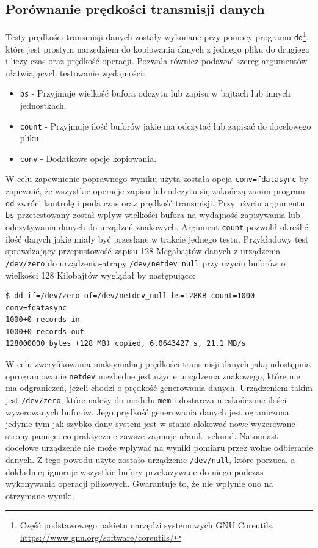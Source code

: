\documentclass[11pt]{scrartcl}
\begin{document}
\subsection{Porównanie prędkości transmisji danych}

Testy prędkości transmisji danych zostały wykonane przy pomocy programu \texttt{dd}\footnote{Część podstawowego pakietu narzędzi systemowych GNU Coreutils. \url{https://www.gnu.org/software/coreutils/}}, które jest prostym narzędziem do kopiowania danych z jednego pliku do drugiego i liczy czas oraz prędkość operacji. Pozwala również podawać szereg argumentów ułatwiających testowanie wydajności:

\begin{itemize}
    \item \texttt{bs} - Przyjmuje wielkość bufora odczytu lub zapisu w bajtach lub innych jednostkach.
    \item \texttt{count} - Przyjmuje ilość buforów jakie ma odczytać lub zapisać do docelowego pliku.
    \item \texttt{conv} - Dodatkowe opcje kopiowania.
\end{itemize}

W celu zapewnienie poprawnego wyniku użyta została opcja \texttt{conv=fdatasync} by zapewnić, że wszystkie operacje zapisu lub odczytu się zakończą zanim program \texttt{dd} zwróci kontrolę i poda czas oraz prędkość transmisji. Przy użyciu argumentu \texttt{bs} przetestowany został wpływ wielkości bufora na wydajność zapisywania lub odczytywania danych do urządzeń znakowych. Argument \texttt{count} pozwolił określić ilość danych jakie miały być przesłane w trakcie jednego testu. Przykładowy test sprawdzający przepustowość zapisu 128 Megabajtów danych z urządzenia \texttt{/dev/zero} do urządzenia-atrapy \texttt{/dev/netdev\_null} przy użyciu buforów o wielkości 128 Kilobajtów wyglądał by następująco:

\begin{verbatim}
$ dd if=/dev/zero of=/dev/netdev_null bs=128KB count=1000 conv=fdatasync
1000+0 records in
1000+0 records out
128000000 bytes (128 MB) copied, 6.0643427 s, 21.1 MB/s
\end{verbatim}

W celu zweryfikowania maksymalnej prędkości transmisji danych jaką udostępnia oprogramowanie \texttt{netdev} niezbędne jest użycie urządzenia znakowego, które nie ma odgraniczeń, jeżeli chodzi o prędkość generowania danych. Urządzeniem takim jest \texttt{/dev/zero}, które należy do modułu \texttt{mem} i dostarcza nieskończone ilości wyzerowanych buforów. Jego prędkość generowania danych jest ograniczona jedynie tym jak szybko dany system jest w stanie alokować nowe wyzerowane strony pamięci co praktycznie zawsze zajmuje ułamki sekund. Natomiast docelowe urządzenie nie może wpływać na wyniki pomiaru przez wolne odbieranie danych. Z tego powodu użyte zostało urządzenie \texttt{/dev/null}, które porzuca, a dokładniej ignoruje wszystkie bufory przekazywane do niego podczas wykonywania operacji plikowych. Gwarantuje to, że nie wpłynie ono na otrzymane wyniki.
\end{document}
